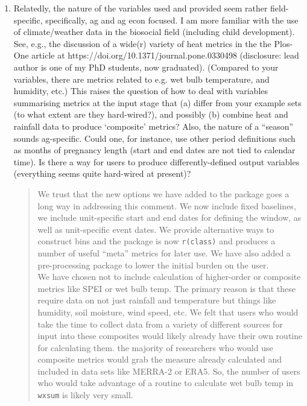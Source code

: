 \documentclass{article}[11pt]
\begin{document}
\begin{enumerate}
    \item Relatedly, the nature of the variables used and provided seem rather field-specific, specifically, ag and ag econ focused. I am more familiar with the use of climate/weather data in the biosocial field (including child development). See, e.g., the discussion of a wide(r) variety of heat metrics in the the Plos-One article at https://doi.org/10.1371/journal.pone.0330498 (disclosure: lead author is one of my PhD students, now graduated). (Compared to your variables, there are metrics related to e.g. wet bulb temperature, and humidity, etc.)  This raises the question of how to deal with variables summarising metrics at the input stage that (a) differ from your example sets (to what extent are they hard-wired?), and possibly (b) combine heat and rainfall data to produce `composite' metrics?  Also, the nature of a ``season'' sounds ag-specific. Could one, for instance, use other period definitions such as months of pregnancy length (start and end dates are not tied to calendar time). Is there a way for users to produce differently-defined output variables (everything seems quite hard-wired at present)? 
    \begin{quote}
        We trust that the new options we have added to the package goes a long way in addressing this comment. We now include fixed baselines, we include unit-specific start and end dates for defining the window, as well as unit-specific event dates. We provide alternative ways to construct bins and the package is now \texttt{r(class)} and produces a number of useful ``meta'' metrics for later use. We have also added a pre-processing package to lower the initial burden on the user. \\

        We have chosen not to include calculation of higher-order or composite metrics like SPEI or wet bulb temp. The primary reason is that these require data on not just rainfall and temperature but things like humidity, soil moisture, wind speed, etc. We felt that users who would take the time to collect data from a variety of different sources for input into these composites would likely already have their own routine for calculating them. the majority of researchers who would use composite metrics would grab the measure already calculated and included in data sets like MERRA-2 or ERA5. So, the number of users who would take advantage of a routine to calculate wet bulb temp in \texttt{wxsum} is likely very small. \\


\end{quote}
\end{enumerate}
\end{document}
